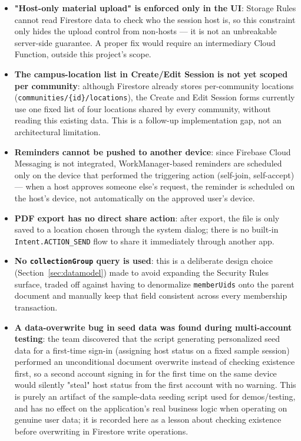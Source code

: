 \begin{itemize}
    \item \textbf{"Host-only material upload" is enforced only in the UI}: Storage Rules cannot read Firestore data to check who the session host is, so this constraint only hides the upload control from non-hosts — it is not an unbreakable server-side guarantee. A proper fix would require an intermediary Cloud Function, outside this project's scope.
    \item \textbf{The campus-location list in Create/Edit Session is not yet scoped per community}: although Firestore already stores per-community locations (\texttt{communities/\{id\}/locations}), the Create and Edit Session forms currently use one fixed list of four locations shared by every community, without reading this existing data. This is a follow-up implementation gap, not an architectural limitation.
    \item \textbf{Reminders cannot be pushed to another device}: since Firebase Cloud Messaging is not integrated, WorkManager-based reminders are scheduled only on the device that performed the triggering action (self-join, self-accept) — when a host approves someone else's request, the reminder is scheduled on the host's device, not automatically on the approved user's device.
    \item \textbf{PDF export has no direct share action}: after export, the file is only saved to a location chosen through the system dialog; there is no built-in \texttt{Intent.ACTION\_SEND} flow to share it immediately through another app.
    \item \textbf{No \texttt{collectionGroup} query is used}: this is a deliberate design choice (Section~\ref{sec:datamodel}) made to avoid expanding the Security Rules surface, traded off against having to denormalize \texttt{memberUids} onto the parent document and manually keep that field consistent across every membership transaction.
    \item \textbf{A data-overwrite bug in seed data was found during multi-account testing}: the team discovered that the script generating personalized seed data for a first-time sign-in (assigning host status on a fixed sample session) performed an unconditional document overwrite instead of checking existence first, so a second account signing in for the first time on the same device would silently "steal" host status from the first account with no warning. This is purely an artifact of the sample-data seeding script used for demos/testing, and has no effect on the application's real business logic when operating on genuine user data; it is recorded here as a lesson about checking existence before overwriting in Firestore write operations.
\end{itemize}
